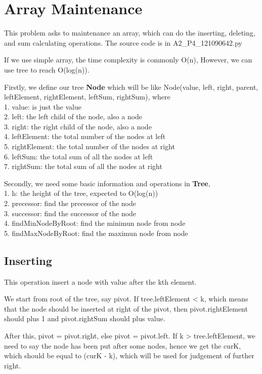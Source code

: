 \section{Array Maintenance}
This problem asks to maintenance an array, which can do the inserting, deleting, and sum calculating operations. The source code is in A2\_P4\_121090642.py

If we use simple array, the time complexity is commonly O(n), However, we can use tree to reach O(log(n)).

Firstly, we define our tree \textbf{Node} which will be like Node(value, left, right, parent, leftElement, rightElement, leftSum, rightSum), where
~\\
1. value: is just the value
~\\
2. left: the left child of the node, also a node
~\\
3. right: the right child of the node, also a node
~\\
4. leftElement: the total number of the nodes at left
~\\
5. rightElement: the total number of the nodes at right
~\\
6. leftSum: the total sum of all the nodes at left
~\\
7. rightSum: the total sum of all the nodes at right

Secondly, we need some basic information and operations in \textbf{Tree},
~\\
1. h: the height of the tree, expected to O(log(n))
~\\
2. precessor: find the precessor of the node
~\\
3. successor: find the successor of the node
~\\
4. findMinNodeByRoot: find the minimun node from node
~\\
5. findMaxNodeByRoot: find the maximun node from node

\subsection{Inserting}
This operation insert a node with value after the kth element.

We start from root of the tree, say pivot. If tree.leftElement < k, which means that the node should be inserted at right of the pivot, then pivot.rightElement should plus 1 and pivot.rightSum should plus value. 

After this, pivot = pivot.right, else pivot = pivot.left. If k > tree.leftElement, we need to say the node has been put after some nodes, hence we get the curK, which should be equal to (curK - k), which will be used for judgement of further right. 


